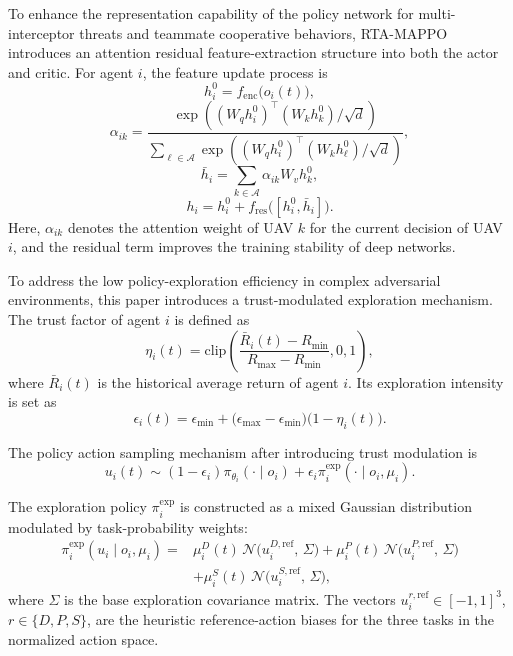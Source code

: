 \documentclass{cja}
\begin{document}
To enhance the representation capability of the policy network for multi-interceptor threats and teammate cooperative behaviors, RTA-MAPPO introduces an attention residual feature-extraction structure into both the actor and critic. For agent $i$, the feature update process is
\begin{equation}
h_i^{0}=f_{\mathrm{enc}}\bigl(o_i(t)\bigr),
\end{equation}
\begin{equation}
\alpha_{ik}
=
\frac{
\exp\left((W_q h_i^{0})^{\top}(W_k h_k^{0})/\sqrt{d}\right)
}{
\sum_{\ell\in\mathcal A}
\exp\left((W_q h_i^{0})^{\top}(W_k h_\ell^{0})/\sqrt{d}\right)
},
\end{equation}
\begin{equation}
\bar h_i
=
\sum_{k\in\mathcal A}\alpha_{ik}W_vh_k^{0},
\end{equation}
\begin{equation}
h_i
=
h_i^{0}
+
f_{\mathrm{res}}\bigl([h_i^{0},\bar h_i]\bigr).
\end{equation}
Here, $\alpha_{ik}$ denotes the attention weight of UAV $k$ for the current decision of UAV $i$, and the residual term improves the training stability of deep networks.

To address the low policy-exploration efficiency in complex adversarial environments, this paper introduces a trust-modulated exploration mechanism. The trust factor of agent $i$ is defined as
\begin{equation}
\eta_i(t)
=
\mathrm{clip}
\left(
\frac{\bar R_i(t)-R_{\min}}{R_{\max}-R_{\min}},
0,1
\right),
\end{equation}
where $\bar R_i(t)$ is the historical average return of agent $i$. Its exploration intensity is set as
\begin{equation}
\epsilon_i(t)
=
\epsilon_{\min}
+
\bigl(\epsilon_{\max}-\epsilon_{\min}\bigr)
\bigl(1-\eta_i(t)\bigr).
\end{equation}

The policy action sampling mechanism after introducing trust modulation is
\begin{equation}
u_i(t)
\sim
(1-\epsilon_i)\pi_{\theta_i}(\cdot\mid o_i)
+
\epsilon_i \pi_i^{\mathrm{exp}}(\cdot\mid o_i,\mu_i).
\end{equation}

The exploration policy $\pi_i^{\mathrm{exp}}$ is constructed as a mixed Gaussian distribution modulated by task-probability weights:
\begin{equation}
\begin{aligned}
\pi_i^{\mathrm{exp}}(u_i\mid o_i,\mu_i)
={}&
\mu_i^D(t)\, \mathcal{N}\bigl(u_i^{D,\mathrm{ref}},\, \Sigma\bigr)
+
\mu_i^P(t)\, \mathcal{N}\bigl(u_i^{P,\mathrm{ref}},\, \Sigma\bigr)\\
&+
\mu_i^S(t)\, \mathcal{N}\bigl(u_i^{S,\mathrm{ref}},\, \Sigma\bigr),
\end{aligned}
\end{equation}
where $\Sigma$ is the base exploration covariance matrix. The vectors $u_i^{r,\mathrm{ref}}\in[-1,1]^3$, $r\in\{D,P,S\}$, are the heuristic reference-action biases for the three tasks in the normalized action space.
\end{document}
